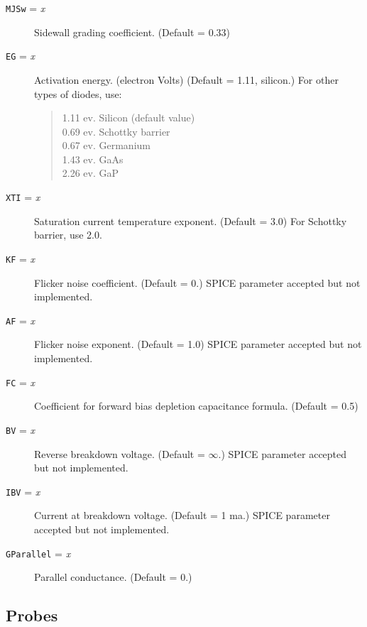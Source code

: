 \begin{description}
\item[{\tt MJSw} = {\it x}] Sidewall grading coefficient.  (Default =
  0.33)
  
\item[{\tt EG} = {\it x}] Activation energy. (electron Volts) (Default
  = 1.11, silicon.)  For other types of diodes, use:
\begin{verse}
1.11 ev.  Silicon (default value)\\
0.69 ev.  Schottky barrier\\
0.67 ev.  Germanium\\
1.43 ev.  GaAs\\
2.26 ev.  GaP
\end{verse}

\item[{\tt XTI} = {\it x}] Saturation current temperature exponent.
  (Default = 3.0) For Schottky barrier, use 2.0.
  
\item[{\tt KF} = {\it x}] Flicker noise coefficient.  (Default = 0.)
  SPICE parameter accepted but not implemented.
  
\item[{\tt AF} = {\it x}] Flicker noise exponent.  (Default = 1.0)
  SPICE parameter accepted but not implemented.
  
\item[{\tt FC} = {\it x}] Coefficient for forward bias depletion
  capacitance formula. (Default = 0.5)
  
\item[{\tt BV} = {\it x}] Reverse breakdown voltage.  (Default =
  $\infty$.)  SPICE parameter accepted but not implemented.
  
\item[{\tt IBV} = {\it x}] Current at breakdown voltage. (Default = 1
  ma.)  SPICE parameter accepted but not implemented.
  
\item[{\tt GParallel} = {\it x}] Parallel conductance. (Default = 0.)

\end{description}
\subsection{Probes}

